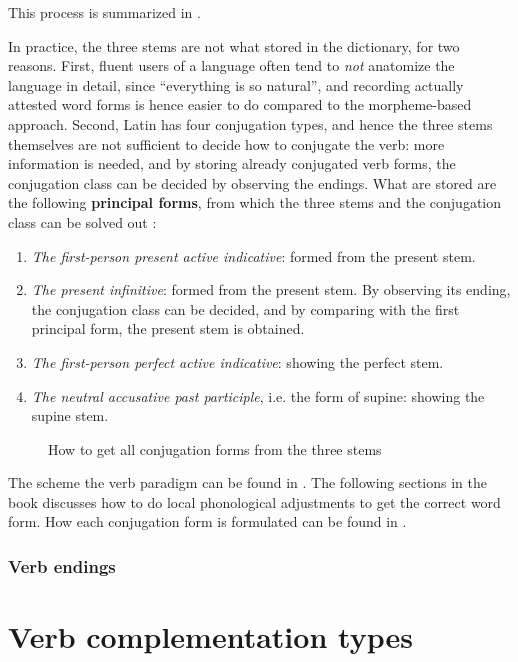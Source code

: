 \documentclass{article}
\newcommand*{\citesec}[1]{\S~{#1}}
\newcommand*{\concept}[1]{\textbf{#1}}
\begin{document}
This process is summarized in .

In practice, the three stems are not what stored in the dictionary,
for two reasons.
First, fluent users of a language often 
tend to \emph{not} anatomize the language in detail,
since ``everything is so natural'', 
and recording actually attested word forms is hence easier to do
compared to the morpheme-based approach.
Second, Latin has four conjugation types,
and hence the three stems themselves are not sufficient to decide how to conjugate the verb:
more information is needed, 
and by storing already conjugated verb forms,
the conjugation class can be decided by observing the endings.
What are stored are the following \concept{principal forms},
from which the three stems and the conjugation class can be solved out
\citep[\citesec{172}]{allen1903allen}:
\begin{enumerate}
    \item \emph{The first-person present active indicative}: formed from the present stem.
    \item \emph{The present infinitive}: formed from the present stem. 
    By observing its ending, the conjugation class can be decided,
    and by comparing with the first principal form, 
    the present stem is obtained.
    \item \emph{The first-person perfect active indicative}: showing the perfect stem.
    \item \emph{The neutral accusative past participle}, i.e. the form of supine: showing the supine stem.
\end{enumerate}

\begin{sidewaysfigure}
    \centering
    
    \caption{How to get all conjugation forms from the three stems}
    \label{fig:stem-to-form}
\end{sidewaysfigure}

The scheme the verb paradigm can be found in \citep[\citesec{166}]{allen1903allen}.
The following sections in the book discusses how to do local phonological adjustments 
to get the correct word form.
How each conjugation form is formulated can be found in \citep[\citesec{180}]{allen1903allen}.

\subsubsection{Verb endings}

\section{Verb complementation types}\label{sec:verb-complement}
\end{document}
